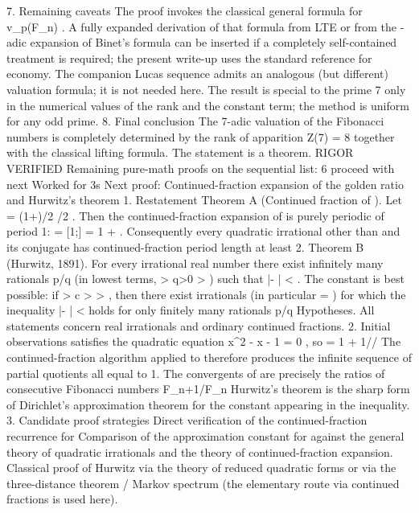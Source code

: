 7. Remaining caveats
The proof invokes the classical general formula for
v_p(F_n)
. A fully expanded derivation of that formula from LTE or from the
-adic expansion of Binet’s formula can be inserted if a completely self-contained treatment is required; the present write-up uses the standard reference for economy.
The companion Lucas sequence admits an analogous (but different) valuation formula; it is not needed here.
The result is special to the prime 7 only in the numerical values of the rank and the constant term; the method is uniform for any odd prime.
8. Final conclusion
The 7-adic valuation of the Fibonacci numbers is completely determined by the rank of apparition
Z(7) = 8
together with the classical lifting formula. The statement is a theorem.
RIGOR VERIFIED
Remaining pure-math proofs on the sequential list: 6
proceed with next
Worked for 3s
Next proof: Continued-fraction expansion of the golden ratio and Hurwitz’s theorem
1. Restatement
Theorem A (Continued fraction of
\varphi
).
Let
\varphi = (1+)/2
/2
. Then the continued-fraction expansion of
\varphi
is purely periodic of period 1:
\varphi = [1;] = 1 + .
Consequently every quadratic irrational other than
\varphi
and its conjugate has continued-fraction period length at least 2.
Theorem B (Hurwitz, 1891).
For every irrational real number
\alpha
there exist infinitely many rationals
p/q
(in lowest terms,
>
q>0
>
) such that
\bigl|\alpha - \bigr| < .
The constant
is best possible: if
>
c > 
>
, then there exist irrationals
\alpha
(in particular
\alpha = \varphi
) for which the inequality
\bigl|\alpha - \bigr| < 
holds for only finitely many rationals
p/q
Hypotheses.
All statements concern real irrationals and ordinary continued fractions.
2. Initial observations
\varphi
satisfies the quadratic equation
x^2 - x - 1 = 0
, so
\varphi = 1 + 1//
The continued-fraction algorithm applied to
\varphi
therefore produces the infinite sequence of partial quotients all equal to 1.
The convergents of
\varphi
are precisely the ratios of consecutive Fibonacci numbers
F_{n+1}/F_n
Hurwitz’s theorem is the sharp form of Dirichlet’s approximation theorem for the constant appearing in the inequality.
3. Candidate proof strategies
Direct verification of the continued-fraction recurrence for
\varphi
Comparison of the approximation constant for
\varphi
against the general theory of quadratic irrationals and the theory of continued-fraction expansion.
Classical proof of Hurwitz via the theory of reduced quadratic forms or via the three-distance theorem / Markov spectrum (the elementary route via continued fractions is used here).
